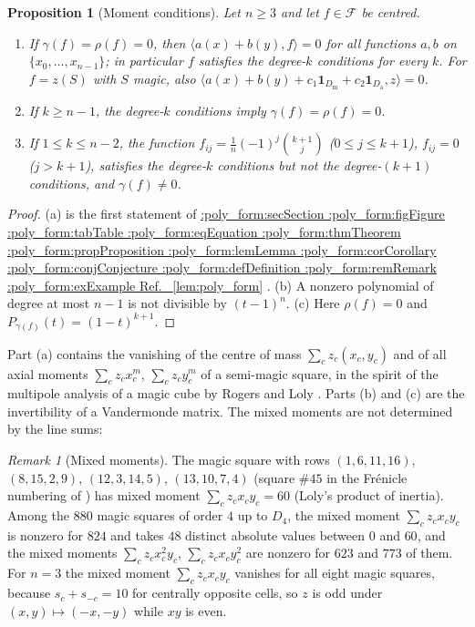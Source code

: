 \documentclass[11pt,a4paper]{article}
\makeatletter
\def\Cref@getprefix#1:#2\relax{#1}
\def\Cref@prefix@sec{sec}
\def\Cref@prefix@fig{fig}
\def\Cref@prefix@tab{tab}
\def\Cref@prefix@eq{eq}
\def\Cref@prefix@thm{thm}
\def\Cref@prefix@prop{prop}
\def\Cref@prefix@lem{lem}
\def\Cref@prefix@cor{cor}
\def\Cref@prefix@conj{conj}
\def\Cref@prefix@def{def}
\def\Cref@prefix@rem{rem}
\def\Cref@prefix@ex{ex}
\def\Cref@type@cap#1{%
  \edef\Cref@tmp{#1}%
  \ifx\Cref@tmp\Cref@prefix@sec Section%
  \else\ifx\Cref@tmp\Cref@prefix@fig Figure%
  \else\ifx\Cref@tmp\Cref@prefix@tab Table%
  \else\ifx\Cref@tmp\Cref@prefix@eq Equation%
  \else\ifx\Cref@tmp\Cref@prefix@thm Theorem%
  \else\ifx\Cref@tmp\Cref@prefix@prop Proposition%
  \else\ifx\Cref@tmp\Cref@prefix@lem Lemma%
  \else\ifx\Cref@tmp\Cref@prefix@cor Corollary%
  \else\ifx\Cref@tmp\Cref@prefix@conj Conjecture%
  \else\ifx\Cref@tmp\Cref@prefix@def Definition%
  \else\ifx\Cref@tmp\Cref@prefix@rem Remark%
  \else\ifx\Cref@tmp\Cref@prefix@ex Example%
  \else Ref.%
  \fi\fi\fi\fi\fi\fi\fi\fi\fi\fi\fi\fi
}
\DeclareRobustCommand{\Cref}[1]{%
  \begingroup
  \edef\Cref@label{#1}%
  \edef\Cref@prefix{\expandafter\Cref@getprefix\Cref@label:\relax}%
  \hyperref[#1]{\Cref@type@cap{\Cref@prefix}~\ref*{#1}}%
  \endgroup
}
\theoremstyle{plain}
\newtheorem{proposition}[theorem]{Proposition}
\theoremstyle{definition}
\theoremstyle{remark}
\newtheorem{remark}[theorem]{Remark}
\makeatother
\begin{document}
\begin{proposition}[Moment conditions]
\label{prop:hierarchy}
Let $n\ge3$ and let $f\in\mathcal F$ be centred.
\begin{enumerate}
\item[(a)] If $\gamma(f)=\rho(f)=0$, then $\langle a(x)+b(y),f\rangle=0$ for all functions $a,b$ on $\{x_0,\dots,x_{n-1}\}$; in particular $f$ satisfies the degree-$k$ conditions for every $k$.
For $f=z(S)$ with $S$ magic, also $\langle a(x)+b(y)+c_1\mathbf 1_{D_{\mathrm m}}+c_2\mathbf 1_{D_{\mathrm a}},z\rangle=0$.
\item[(b)] If $k\ge n-1$, the degree-$k$ conditions imply $\gamma(f)=\rho(f)=0$.
\item[(c)] If $1\le k\le n-2$, the function $f_{ij}=\frac1n(-1)^{j}\binom{k+1}{j}$ ($0\le j\le k+1$), $f_{ij}=0$ ($j>k+1$), satisfies the degree-$k$ conditions but not the degree-$(k+1)$ conditions, and $\gamma(f)\ne0$.
\end{enumerate}
\end{proposition}

\begin{proof}
(a) is the first statement of \Cref{lem:poly_form}.  (b) A nonzero polynomial of degree at most $n-1$ is not divisible by $(t-1)^{n}$.  (c) Here $\rho(f)=0$ and $P_{\gamma(f)}(t)=(1-t)^{k+1}$.
\end{proof}

Part (a) contains the vanishing of the centre of mass $\sum_cz_c(x_c,y_c)$ and of all axial moments $\sum_cz_cx_c^m$, $\sum_cz_cy_c^m$ of a semi-magic square, in the spirit of the multipole analysis of a magic cube by Rogers and Loly \cite{rogers2005multipole}.
Parts (b) and (c) are the invertibility of a Vandermonde matrix.
The mixed moments are not determined by the line sums:

\begin{remark}[Mixed moments]
\label{rem:product_inertia}
The magic square with rows $(1,6,11,16)$, $(8,15,2,9)$, $(12,3,14,5)$, $(13,10,7,4)$ (square $\#45$ in the Fr\'enicle numbering of \cite{mathewson_gems}) has mixed moment $\sum_cz_cx_cy_c=60$ (Loly's product of inertia).
Among the $880$ magic squares of order $4$ up to $D_4$, the mixed moment $\sum_cz_cx_cy_c$ is nonzero for $824$ and takes $48$ distinct absolute values between $0$ and $60$, and the mixed moments $\sum_cz_cx_c^2y_c$, $\sum_cz_cx_cy_c^2$ are nonzero for $623$ and $773$ of them.
For $n=3$ the mixed moment $\sum_cz_cx_cy_c$ vanishes for all eight magic squares, because $s_c+s_{-c}=10$ for centrally opposite cells, so $z$ is odd under $(x,y)\mapsto(-x,-y)$ while $xy$ is even.
\end{remark}
\end{document}

